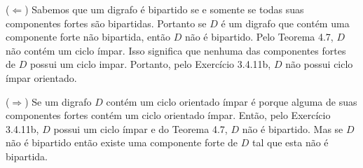 
($\Leftarrow$) Sabemos que um digrafo é bipartido se e somente se todas suas
componentes fortes são bipartidas. Portanto se $D$ é um digrafo que contém uma
componente forte não bipartida, então $D$ não é bipartido. Pelo Teorema 4.7, $D$
não contém um ciclo ímpar. Isso significa que nenhuma das componentes fortes de
$D$ possui um ciclo impar. Portanto, pelo Exercício 3.4.11b, $D$ não possui ciclo
ímpar orientado.

($\Rightarrow$) Se um digrafo $D$ contém um ciclo orientado ímpar é porque alguma
de suas componentes fortes contém um ciclo orientado ímpar. Então, pelo Exercício
3.4.11b, $D$ possui um ciclo ímpar e do Teorema 4.7, $D$ não é bipartido. Mas se
$D$ não é bipartido então existe uma componente forte de $D$ tal que esta não é
bipartida.
\fimprova

